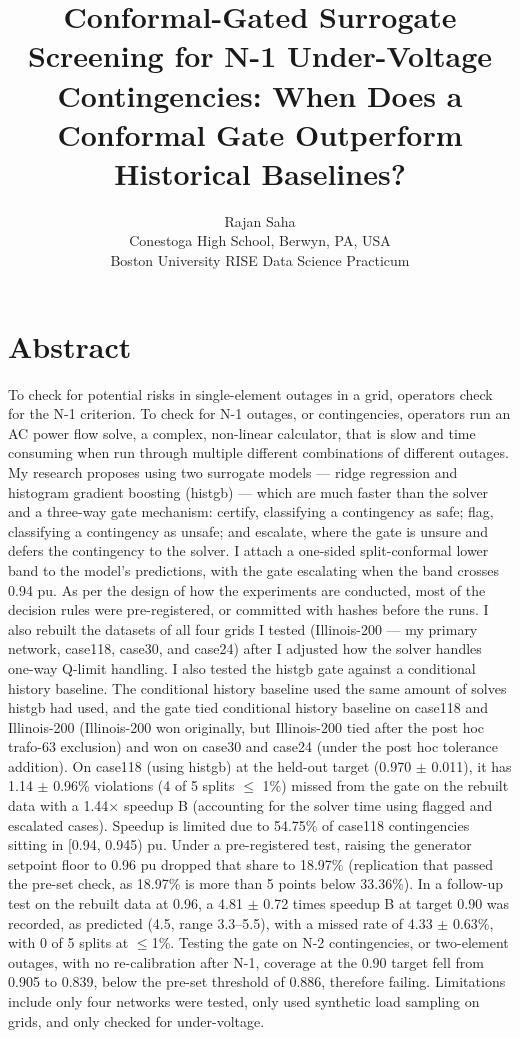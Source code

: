 \documentclass[12pt]{article}
\title{\textbf{Conformal-Gated Surrogate Screening for N-1 Under-Voltage Contingencies: When Does a Conformal Gate Outperform Historical Baselines?}}
\author{Rajan Saha\\
\small Conestoga High School, Berwyn, PA, USA\\
\small Boston University RISE Data Science Practicum}
\date{}
\begin{document}
\maketitle
\thispagestyle{empty}\newpage


\section*{Abstract}
To check for potential risks in single-element outages in a grid, operators check for the N-1 criterion. To check for N-1 outages, or contingencies, operators run an AC power flow solve, a complex, non-linear calculator, that is slow and time consuming when run through multiple different combinations of different outages. My research proposes using two surrogate models — ridge regression and histogram gradient boosting (histgb) — which are much faster than the solver and a three-way gate mechanism: certify, classifying a contingency as safe; flag, classifying a contingency as unsafe; and escalate, where the gate is unsure and defers the contingency to the solver. I attach a one-sided split-conformal lower band to the model's predictions, with the gate escalating when the band crosses 0.94 pu. As per the design of how the experiments are conducted, most of the decision rules were pre-registered, or committed with hashes before the runs. I also rebuilt the datasets of all four grids I tested (Illinois-200 — my primary network, case118, case30, and case24) after I adjusted how the solver handles one-way Q-limit handling. I also tested the histgb gate against a conditional history baseline. The conditional history baseline used the same amount of solves histgb had used, and the gate tied conditional history baseline on case118 and Illinois-200 (Illinois-200 won originally, but Illinois-200 tied after the post hoc trafo-63 exclusion) and won on case30 and case24 (under the post hoc tolerance addition). On case118 (using histgb) at the held-out target (0.970 $\pm$ 0.011), it has 1.14 $\pm$ 0.96\% violations (4 of 5 splits $\leq$ 1\%) missed from the gate on the rebuilt data with a 1.44$\times$ speedup B (accounting for the solver time using flagged and escalated cases). Speedup is limited due to 54.75\% of case118 contingencies sitting in [0.94, 0.945) pu. Under a pre-registered test, raising the generator setpoint floor to 0.96 pu dropped that share to 18.97\% (replication that passed the pre-set check, as 18.97\% is more than 5 points below 33.36\%). In a follow-up test on the rebuilt data at 0.96, a 4.81 $\pm$ 0.72 times speedup B at target 0.90 was recorded, as predicted (4.5, range 3.3--5.5), with a missed rate of 4.33 $\pm$ 0.63\%, with 0 of 5 splits at $\leq$1\%. Testing the gate on N-2 contingencies, or two-element outages, with no re-calibration after N-1, coverage at the 0.90 target fell from 0.905 to 0.839, below the pre-set threshold of 0.886, therefore failing. Limitations include only four networks were tested, only used synthetic load sampling on grids, and only checked for under-voltage.
\end{document}
